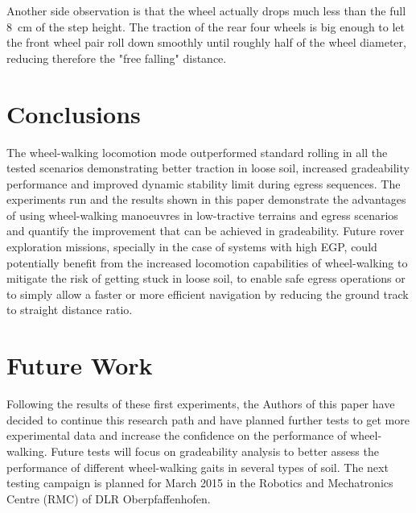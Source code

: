 \documentclass[a4paper,twocolumn]{esapub2005} %
\begin{document}
Another side observation is that the wheel actually drops much less than the
full 8~\unit{cm} of the step height. The traction of the rear four wheels is big enough to
let the front wheel pair roll down smoothly until roughly half of the wheel
diameter, reducing therefore the "free falling" distance.


\section{Conclusions}
The wheel-walking locomotion mode outperformed standard rolling in all the
tested scenarios demonstrating better traction in loose soil, increased
gradeability performance and improved dynamic stability limit during egress
sequences. The experiments run and the results shown in this paper demonstrate
the advantages of using wheel-walking manoeuvres in low-tractive terrains and
egress scenarios and quantify the improvement that can be achieved in
gradeability.  Future rover exploration missions, specially in the case of
systems with high EGP, could potentially benefit from the increased locomotion
capabilities of wheel-walking to mitigate the risk of getting stuck in loose
soil, to enable safe egress operations or to simply allow a faster or more
efficient navigation by reducing the ground track to straight distance ratio.

\section{Future Work}
Following the results of these first experiments, the Authors of this paper have decided to
continue this research path and have planned further tests to get more
experimental data and increase the confidence on the performance of
wheel-walking.  Future tests will focus on gradeability analysis to better
assess the performance of different wheel-walking gaits in several types of
soil.  The next testing campaign is planned for March 2015 in the Robotics
and Mechatronics Centre (RMC) of DLR Oberpfaffenhofen.


\vspace{-3 mm}




\end{document}
